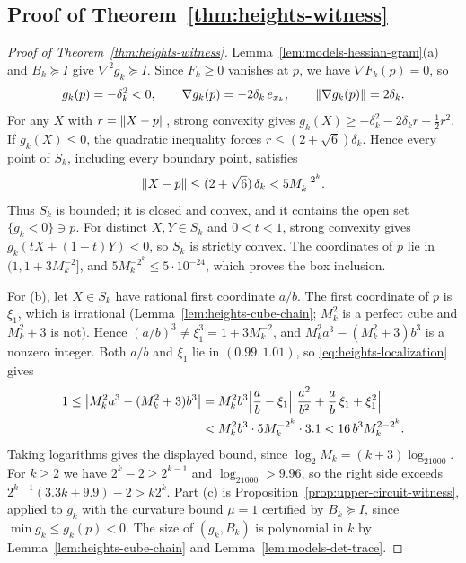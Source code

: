 \subsection{Proof of Theorem~\ref{thm:heights-witness}}
\label{app:heights-witness}

\begin{proof}[Proof of Theorem~\ref{thm:heights-witness}]
Lemma~\ref{lem:models-hessian-gram}(a) and $B_k\succeq I$ give
$\nabla^2g_k\succeq I$. Since $F_k\ge0$ vanishes at $p$, we have
$\nabla F_k(p)=0$, so
\[
 g_k(p)=-\delta_k^2<0,\qquad \nabla g_k(p)=-2\delta_k\,e_{x_k},
 \qquad \left\lVert\nabla g_k(p)\right\rVert=2\delta_k.
\]
For any $X$ with $r=\left\lVert X-p\right\rVert$, strong convexity gives
$g_k(X)\ge-\delta_k^2-2\delta_kr+\frac12r^2$. If $g_k(X)\le0$, the quadratic
inequality forces $r\le(2+\sqrt6)\delta_k$. Hence every point of $S_k$,
including every boundary point, satisfies
\begin{equation}
 \left\lVert X-p\right\rVert\le(2+\sqrt6)\,\delta_k<5M_k^{-2^k}.
 \label{eq:heights-localization}
\end{equation}
Thus $S_k$ is bounded; it is closed and convex, and it contains the open set
$\{g_k<0\}\ni p$. For distinct $X,Y\in S_k$ and $0<t<1$, strong convexity
gives $g_k(tX+(1-t)Y)<0$, so $S_k$ is strictly convex. The coordinates of
$p$ lie in $(1,1+3M_k^{-2}]$, and $5M_k^{-2^k}\le5\cdot10^{-24}$, which proves
the box inclusion.

For (b), let $X\in S_k$ have rational first coordinate $a/b$. The first
coordinate of $p$ is $\xi_1$, which is irrational
(Lemma~\ref{lem:heights-cube-chain}; $M_k^2$ is a perfect cube and
$M_k^2+3$ is not). Hence $(a/b)^3\ne\xi_1^3=1+3M_k^{-2}$, and
$M_k^2a^3-(M_k^2+3)b^3$ is a nonzero integer. Both $a/b$ and $\xi_1$ lie in
$(0.99,1.01)$, so \eqref{eq:heights-localization} gives
\begin{align*}
 1\le\bigl|M_k^2a^3-(M_k^2+3)b^3\bigr|
 &=M_k^2b^3\Bigl|\frac ab-\xi_1\Bigr|
   \Bigl|\frac{a^2}{b^2}+\frac ab\,\xi_1+\xi_1^2\Bigr|\\
 &<M_k^2b^3\cdot5M_k^{-2^k}\cdot3.1
 <16\,b^3M_k^{2-2^k}.
\end{align*}
Taking logarithms gives the displayed bound, since
$\log_2M_k=(k+3)\log_21000$. For $k\ge2$ we have $2^k-2\ge2^{k-1}$ and
$\log_21000>9.96$, so the right side exceeds
$2^{k-1}(3.3k+9.9)-2>k2^k$. Part (c) is Proposition~\ref{prop:upper-circuit-witness}, applied to
$g_k$ with the curvature bound $\mu=1$ certified by $B_k\succeq I$, since
$\min g_k\le g_k(p)<0$. The size of $(g_k,B_k)$ is polynomial in $k$ by
Lemma~\ref{lem:heights-cube-chain} and Lemma~\ref{lem:models-det-trace}.
\end{proof}

